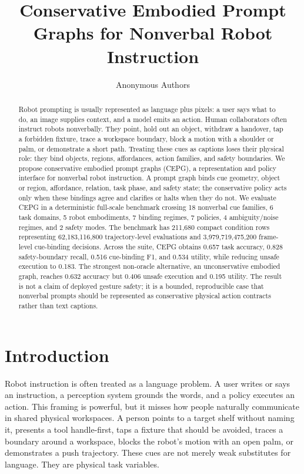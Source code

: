 \documentclass{article}
\title{Conservative Embodied Prompt Graphs for Nonverbal Robot Instruction}
\author{Anonymous Authors}
\newcommand{\method}{CEPG}
\newcommand{\rowN}{211{,}680}
\newcommand{\trajN}{62{,}183{,}116{,}800}
\newcommand{\frameN}{3{,}979{,}719{,}475{,}200}
\begin{document}
\maketitle

\begin{abstract}
Robot prompting is usually represented as language plus pixels: a user says what to do, an image supplies context, and a model emits an action. Human collaborators often instruct robots nonverbally. They point, hold out an object, withdraw a handover, tap a forbidden fixture, trace a workspace boundary, block a motion with a shoulder or palm, or demonstrate a short path. Treating these cues as captions loses their physical role: they bind objects, regions, affordances, action families, and safety boundaries. We propose conservative embodied prompt graphs (\method{}), a representation and policy interface for nonverbal robot instruction. A prompt graph binds cue geometry, object or region, affordance, relation, task phase, and safety state; the conservative policy acts only when these bindings agree and clarifies or halts when they do not. We evaluate \method{} in a deterministic full-scale benchmark crossing 18 nonverbal cue families, 6 task domains, 5 robot embodiments, 7 binding regimes, 7 policies, 4 ambiguity/noise regimes, and 2 safety modes. The benchmark has \rowN{} compact condition rows representing \trajN{} trajectory-level evaluations and \frameN{} frame-level cue-binding decisions. Across the suite, \method{} obtains 0.657 task accuracy, 0.828 safety-boundary recall, 0.516 cue-binding F1, and 0.534 utility, while reducing unsafe execution to 0.183. The strongest non-oracle alternative, an unconservative embodied graph, reaches 0.632 accuracy but 0.406 unsafe execution and 0.195 utility. The result is not a claim of deployed gesture safety; it is a bounded, reproducible case that nonverbal prompts should be represented as conservative physical action contracts rather than text captions.
\end{abstract}

\section{Introduction}

Robot instruction is often treated as a language problem. A user writes or says an instruction, a perception system grounds the words, and a policy executes an action. This framing is powerful, but it misses how people naturally communicate in shared physical workspaces. A person points to a target shelf without naming it, presents a tool handle-first, taps a fixture that should be avoided, traces a boundary around a workspace, blocks the robot's motion with an open palm, or demonstrates a push trajectory. These cues are not merely weak substitutes for language. They are physical task variables.
\end{document}
